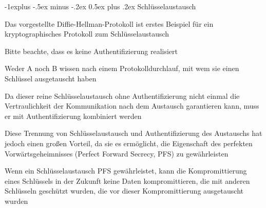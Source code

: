 \documentclass[a4paper]{article}
\makeatletter
\renewcommand{\subsection}{\@startsection{subsection}{2}{0mm}%
 {-1explus -.5ex minus -.2ex}%
 {0.5ex plus .2ex}%
 {\normalfont\normalsize\bfseries}}
\makeatother
\begin{document}
\begin{multicols}{3}
      \subsection{Schlüsselaustausch}
      \begin{itemize*}
            \item Das vorgestellte Diffie-Hellman-Protokoll ist erstes Beispiel für ein kryptographisches Protokoll zum Schlüsselaustausch
            \item Bitte beachte, dass es keine Authentifizierung realisiert
            \item Weder A noch B wissen nach einem Protokolldurchlauf, mit wem sie einen Schlüssel ausgetauscht haben
            \item Da dieser reine Schlüsselaustausch ohne Authentifizierung nicht einmal die Vertraulichkeit der Kommunikation nach dem Austausch garantieren kann, muss er mit Authentifizierung kombiniert werden
            \item Diese Trennung von Schlüsselaustausch und Authentifizierung des Austauschs hat jedoch einen großen Vorteil, da sie es ermöglicht, die Eigenschaft des perfekten Vorwärtsgeheimnisses (Perfect Forward Secrecy, PFS) zu gewährleisten
            \item Wenn ein Schlüsselaustausch PFS gewährleistet, kann die Kompromittierung eines Schlüssels in der Zukunft keine Daten kompromittieren, die mit anderen Schlüsseln geschützt wurden, die vor dieser Kompromittierung ausgetauscht wurden
      \end{itemize*}


\end{multicols}
\end{document}
